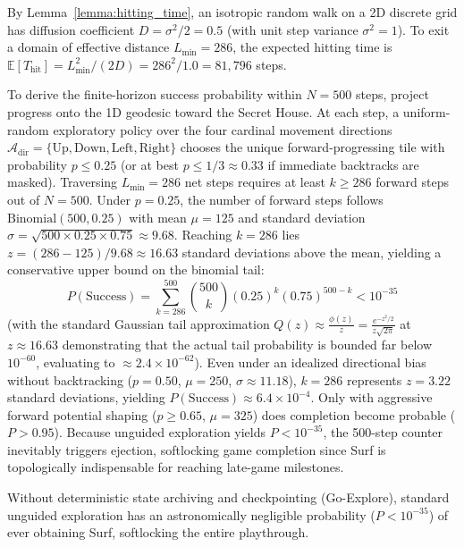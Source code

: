 \documentclass[journal,10pt,twocolumn]{IEEEtran}
\begin{document}
\begin{IEEEproof}
By Lemma~\ref{lemma:hitting_time}, an isotropic random walk on a 2D discrete grid has diffusion coefficient $D = \sigma^2 / 2 = 0.5$ (with unit step variance $\sigma^2 = 1$). To exit a domain of effective distance $L_{\min} = 286$, the expected hitting time is $\mathbb{E}[T_{\text{hit}}] = L_{\min}^2 / (2D) = 286^2 / 1.0 = 81{,}796$ steps.

To derive the finite-horizon success probability within $N = 500$ steps, project progress onto the 1D geodesic toward the Secret House. At each step, a uniform-random exploratory policy over the four cardinal movement directions $\mathcal{A}_{\text{dir}} = \{\text{Up}, \text{Down}, \text{Left}, \text{Right}\}$ chooses the unique forward-progressing tile with probability $p \le 0.25$ (or at best $p \le 1/3 \approx 0.33$ if immediate backtracks are masked). Traversing $L_{\min} = 286$ net steps requires at least $k \ge 286$ forward steps out of $N = 500$. Under $p = 0.25$, the number of forward steps follows $\text{Binomial}(500, 0.25)$ with mean $\mu = 125$ and standard deviation $\sigma = \sqrt{500 \times 0.25 \times 0.75} \approx 9.68$. Reaching $k = 286$ lies $z = (286 - 125) / 9.68 \approx 16.63$ standard deviations above the mean, yielding a conservative upper bound on the binomial tail:
\begin{equation}
P(\text{Success}) = \sum_{k=286}^{500} \binom{500}{k} (0.25)^k (0.75)^{500-k} < 10^{-35}
\end{equation}
(with the standard Gaussian tail approximation $Q(z) \approx \frac{\phi(z)}{z} = \frac{e^{-z^2/2}}{z\sqrt{2\pi}}$ at $z \approx 16.63$ demonstrating that the actual tail probability is bounded far below $10^{-60}$, evaluating to $\approx 2.4 \times 10^{-62}$).
Even under an idealized directional bias without backtracking ($p = 0.50$, $\mu = 250$, $\sigma \approx 11.18$), $k = 286$ represents $z = 3.22$ standard deviations, yielding $P(\text{Success}) \approx 6.4 \times 10^{-4}$. Only with aggressive forward potential shaping ($p \ge 0.65$, $\mu = 325$) does completion become probable ($P > 0.95$). Because unguided exploration yields $P < 10^{-35}$, the 500-step counter inevitably triggers ejection, softlocking game completion since Surf is topologically indispensable for reaching late-game milestones.
\end{IEEEproof}
Without deterministic state archiving and checkpointing (Go-Explore), standard unguided exploration has an astronomically negligible probability ($P < 10^{-35}$) of ever obtaining Surf, softlocking the entire playthrough.
\end{document}
